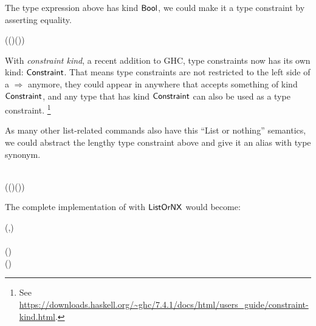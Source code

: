 The type expression above has kind \ensuremath{\Conid{Bool}}, we could make it
 a type constraint by asserting equality.

\begin{hscode}\SaveRestoreHook
{}%
%
\>[B]{}(\;(\;\;)\mathrel{\vee}\;(\;\;))\mathord{\sim}\<[E]%
\ColumnHook
\end{hscode}\resethooks

With \emph{constraint kind}, a recent addition to GHC, type constraints now has
 its own kind: \ensuremath{\Conid{Constraint}}. That means type constraints
 are not restricted to the left side of a \ensuremath{\Rightarrow } anymore,
 they could appear in anywhere that accepts something of kind
 \ensuremath{\Conid{Constraint}}, and any type that has kind
 \ensuremath{\Conid{Constraint}} can also be used as a type constraint.
 \footnote{See \url{https://downloads.haskell.org/~ghc/7.4.1/docs/html/users_guide/constraint-kind.html}.}

As many other list-related commands also have this ``List or nothing'' semantics,
 we could abstract the lengthy type constraint above and give it an alias with
 type synonym.

\begin{hscode}\SaveRestoreHook
{}%
%
%
\>[B]{}\;\;\mathrel{=}{}\<[E]%
\\
\>[B]{}\<[5]%
\>[5]{}(\;(\;\;)\mathrel{\vee}\;(\;\;))\mathord{\sim}\<[E]%
\ColumnHook
\end{hscode}\resethooks

The complete implementation of  with
\ensuremath{\Conid{ListOrNX}} would become:

\begin{hscode}\SaveRestoreHook
{}%
%
%
\>[B]{}\mathbin{::}(\;,\;\;){}\<[E]%
\\
\>[B]{}\<[9]%
\>[9]{}\Rightarrow {}\;\<[E]%
\\
\>[B]{}\<[9]%
\>[9]{}\to {}\;\;\;(\;\;){}\<[E]%
\\
\>[B]{}\;\mathrel{=}\mathbin{\$}\;(\;){}\<[E]%
\ColumnHook
\end{hscode}\resethooks

